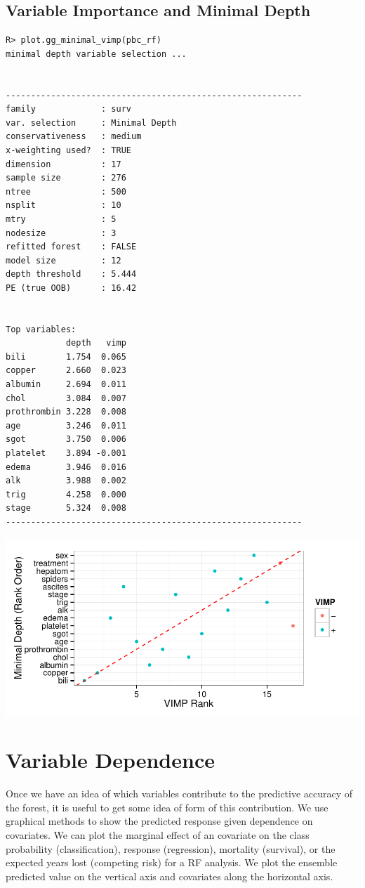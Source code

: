 \documentclass[nojss]{jss}\usepackage[]{graphicx}\usepackage[]{color}
\makeatletter
\def\maxwidth{ %
  \ifdim\Gin@nat@width>\linewidth
    \linewidth
  \else
    \Gin@nat@width
  \fi
}
\newenvironment{kframe}{%
 \def\at@end@of@kframe{}%
 \ifinner\ifhmode%
  \def\at@end@of@kframe{\end{minipage}}%
  \begin{minipage}{\columnwidth}%
 \fi\fi%
 \def\FrameCommand##1{\hskip\@totalleftmargin \hskip-\fboxsep
 \colorbox{shadecolor}{##1}\hskip-\fboxsep
     \hskip-\linewidth \hskip-\@totalleftmargin \hskip\columnwidth}%
 \MakeFramed {\advance\hsize-\width
   \@totalleftmargin\z@ \linewidth\hsize
   \@setminipage}}%
 {\par\unskip\endMakeFramed%
 \at@end@of@kframe}
\newenvironment{knitrout}{}{} %
\makeatother
\begin{document}
\subsection{Variable Importance and Minimal Depth}
\begin{knitrout}\footnotesize
{}\color{fgcolor}\begin{kframe}
\begin{verbatim}
R> plot.gg_minimal_vimp(pbc_rf)
minimal depth variable selection ...


-----------------------------------------------------------
family             : surv 
var. selection     : Minimal Depth 
conservativeness   : medium 
x-weighting used?  : TRUE 
dimension          : 17 
sample size        : 276 
ntree              : 500 
nsplit             : 10 
mtry               : 5 
nodesize           : 3 
refitted forest    : FALSE 
model size         : 12 
depth threshold    : 5.444 
PE (true OOB)      : 16.42 


Top variables:
            depth   vimp
bili        1.754  0.065
copper      2.660  0.023
albumin     2.694  0.011
chol        3.084  0.007
prothrombin 3.228  0.008
age         3.246  0.011
sgot        3.750  0.006
platelet    3.894 -0.001
edema       3.946  0.016
alk         3.988  0.002
trig        4.258  0.000
stage       5.324  0.008
-----------------------------------------------------------
\end{verbatim}
\end{kframe}

{\centering \includegraphics[width=\maxwidth]{figure/vig-pbc-minvimp-1} 

}



\end{knitrout}


\section{Variable Dependence}
Once we have an idea of which variables contribute to the predictive accuracy of the forest, it is useful to get some idea of form of this contribution. We use graphical methods to show the predicted response given dependence on covariates. We can plot the marginal effect of an covariate on the class probability (classification), response (regression), mortality (survival), or the expected years lost (competing risk) for a RF analysis. We plot the ensemble predicted value on the vertical axis and covariates along the horizontal axis.
\end{document}
